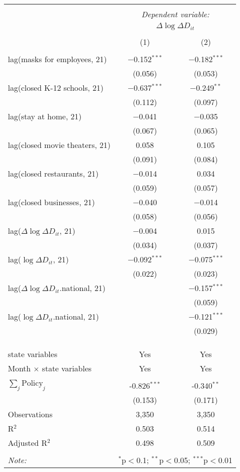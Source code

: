 \begin{tabular}{@{\extracolsep{1pt}}lcc} 
\\[-1.8ex]\hline 
\hline \\[-1.8ex] 
 & \multicolumn{2}{c}{\textit{Dependent variable:}} \\ 
\cline{2-3} 
 & \multicolumn{2}{c}{$\Delta \log \Delta D_{it}$} \\ 
\\[-1.8ex] & (1) & (2)\\ 
\hline \\[-1.8ex] 
 lag(masks for employees, 21) & $-$0.152$^{***}$ & $-$0.182$^{***}$ \\ 
  & (0.056) & (0.053) \\ 
  lag(closed K-12 schools, 21) & $-$0.637$^{***}$ & $-$0.249$^{**}$ \\ 
  & (0.112) & (0.097) \\ 
  lag(stay at home, 21) & $-$0.041 & $-$0.035 \\ 
  & (0.067) & (0.065) \\ 
  lag(closed movie theaters, 21) & 0.058 & 0.105 \\ 
  & (0.091) & (0.084) \\ 
  lag(closed restaurants, 21) & $-$0.014 & 0.034 \\ 
  & (0.059) & (0.057) \\ 
  lag(closed businesses, 21) & $-$0.040 & $-$0.014 \\ 
  & (0.058) & (0.056) \\ 
  lag($\Delta \log \Delta D_{it}$, 21) & $-$0.004 & 0.015 \\ 
  & (0.034) & (0.037) \\ 
  lag($\log \Delta D_{it}$, 21) & $-$0.092$^{***}$ & $-$0.075$^{***}$ \\ 
  & (0.022) & (0.023) \\ 
  lag($\Delta \log \Delta D_{it}$.national, 21) &  & $-$0.157$^{***}$ \\ 
  &  & (0.059) \\ 
  lag($\log \Delta D_{it}$.national, 21) &  & $-$0.121$^{***}$ \\ 
  &  & (0.029) \\ 
   &  &  \\ 
  &  &  \\ 
 \hline \\[-1.8ex] 
state variables & Yes & Yes \\ 
Month $\times$ state variables & Yes & Yes \\ 
\hline \\[-1.8ex] 
$\sum_j \mathrm{Policy}_j$ & -0.826$^{***}$ & -0.340$^{**}$ \\ 
 & (0.153) & (0.171) \\ 
Observations & 3,350 & 3,350 \\ 
R$^{2}$ & 0.503 & 0.514 \\ 
Adjusted R$^{2}$ & 0.498 & 0.509 \\ 
\hline 
\hline \\[-1.8ex] 
\textit{Note:}  & \multicolumn{2}{r}{$^{*}$p$<$0.1; $^{**}$p$<$0.05; $^{***}$p$<$0.01} \\ 
\end{tabular} 